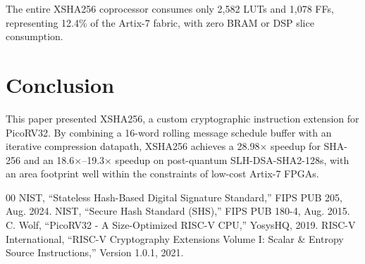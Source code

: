 \documentclass[conference]{IEEEtran}
\begin{document}


The entire XSHA256 coprocessor consumes only 2,582 LUTs and 1,078 FFs, representing 12.4\% of the Artix-7 fabric, with zero BRAM or DSP slice consumption.

\section{Conclusion}
This paper presented XSHA256, a custom cryptographic instruction extension for PicoRV32. By combining a 16-word rolling message schedule buffer with an iterative compression datapath, XSHA256 achieves a 28.98$\times$ speedup for SHA-256 and an 18.6$\times$--19.3$\times$ speedup on post-quantum SLH-DSA-SHA2-128s, with an area footprint well within the constraints of low-cost Artix-7 FPGAs.


\begin{thebibliography}{00}
 NIST, ``Stateless Hash-Based Digital Signature Standard,'' FIPS PUB 205, Aug. 2024.
 NIST, ``Secure Hash Standard (SHS),'' FIPS PUB 180-4, Aug. 2015.
 C. Wolf, ``PicoRV32 - A Size-Optimized RISC-V CPU,'' YosysHQ, 2019.
 RISC-V International, ``RISC-V Cryptography Extensions Volume I: Scalar & Entropy Source Instructions,'' Version 1.0.1, 2021.
\end{thebibliography}
\end{document}
